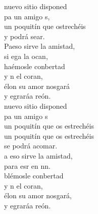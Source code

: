 \begin{cancion}%
	nuevo sitio disponed\\
	pa un amigo s,\\
	un poquitín que ostrechéis\\
	y podrá sear.\\
	Paeso sirve la amistad,\\
	si ega la ocan, \\
	haémosle conbertad\\
	y n el coran,\\
	élon su amor nosgará\\
	y egraráa reón.\\
\jump
	nuevo sitio disponed\\
	pa un amigo s\\
un poquitín que os estrechéis\\
un poquitín que os estrechéis\\
	se podrá acomar.\\
	a eso sirve la amistad,\\
	para esr en nn.\\
	blémosle conbertad\\
	y n el coran,\\
	élon su amor nosgará,\\
	y egraráa reón.\\
\end{cancion}%
